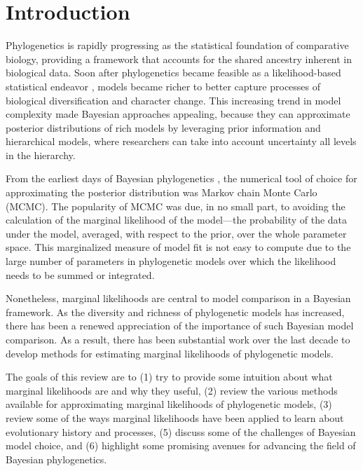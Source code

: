 \section{Introduction}

Phylogenetics is rapidly progressing as the statistical foundation of
comparative biology, providing a framework that accounts for the shared
ancestry inherent in biological data.
Soon after phylogenetics became feasible as a likelihood-based statistical
endeavor \citep{Felsenstein1981}, models became richer to better
capture processes of biological diversification and character change.
This increasing trend in model complexity made Bayesian approaches appealing,
because they can approximate posterior distributions of rich models by
leveraging prior information and hierarchical models, where researchers can
take into account uncertainty  all levels in the hierarchy.

From the earliest days of Bayesian phylogenetics \citep{Rannala1996,Mau1997},
the numerical tool of choice for approximating the posterior distribution was
Markov chain Monte Carlo (MCMC).
The popularity of MCMC was due, in no small part, to avoiding the calculation
of the marginal likelihood of the model---the probability of the data under the
model, averaged, with respect to the prior, over the whole parameter space.
This marginalized measure of model fit is not easy to compute due to the large
number of parameters in phylogenetic models  over which the likelihood needs to be summed or integrated. 

Nonetheless, marginal likelihoods are central to model comparison in a Bayesian
framework.
As the diversity and richness of phylogenetic models has increased, there has
been a renewed appreciation of the importance of such Bayesian model
comparison.
As a result, there has been substantial work over the last decade to develop
methods for estimating marginal likelihoods of phylogenetic models.

The goals of this review are to
(1) try to provide some intuition about what marginal likelihoods are and why
they  useful,
(2) review the various methods available for approximating marginal likelihoods
of phylogenetic models,
(3) review some of the ways marginal likelihoods have been applied to learn
about evolutionary history and processes,
(5) discuss some of the challenges of Bayesian model choice, and
(6) highlight some promising avenues for advancing the field of Bayesian
phylogenetics.

